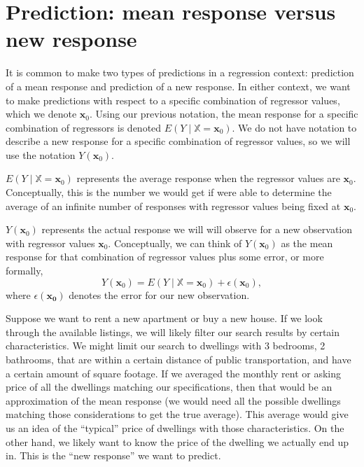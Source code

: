 \documentclass[
]{book}
\theoremstyle{definition}
\theoremstyle{definition}
\theoremstyle{definition}
\theoremstyle{definition}
\theoremstyle{remark}
\begin{document}
\hypertarget{prediction-mean-response-versus-new-response}{%
\section{Prediction: mean response versus new response}\label{prediction-mean-response-versus-new-response}}

It is common to make two types of predictions in a regression context: prediction of a mean response and prediction of a new response. In either context, we want to make predictions with respect to a specific
combination of regressor values, which we denote \(\mathbf{x}_0\). Using our previous notation, the mean response for a specific combination of regressors is denoted \(E(Y\mid \mathbb{X}=\mathbf{x}_0)\). We do not have
notation to describe a new response for a specific combination of regressor values, so we will use the notation \(Y(\mathbf{x}_0)\).

\(E(Y\mid \mathbb{X}=\mathbf{x}_0)\) represents the average response when the regressor values are \(\mathbf{x}_0\). Conceptually, this is the number we would get if were able to determine the average of an infinite number of responses with regressor values being fixed at \(\mathbf{x}_0\).

\(Y(\mathbf{x}_0)\) represents the actual response we will will observe for a new observation with regressor values \(\mathbf{x}_0\). Conceptually, we can think of \(Y(\mathbf{x}_0)\) as the mean response for that combination of regressor values plus some error, or more formally,
\[
Y(\mathbf{x}_0)=E(Y\mid \mathbb{X}=\mathbf{x}_0)+\epsilon(\mathbf{x}_0),
\]
where \(\epsilon(\mathbf{x_0})\) denotes the error for our new observation.

Suppose we want to rent a new apartment or buy a new house. If we look through the available listings, we will likely filter our search results by certain characteristics. We might limit our search to dwellings with 3 bedrooms, 2 bathrooms, that are within a certain distance of public transportation, and have a certain amount of square footage. If we averaged the monthly rent or asking price of all the dwellings matching our specifications, then that would be an approximation of the mean response (we would need all the possible dwellings matching those considerations to get the true average). This average would give us an idea of the ``typical'' price of dwellings with those characteristics. On the other hand, we likely want to know the price of the dwelling we actually end up in. This is the ``new response'' we want to predict.
\end{document}
